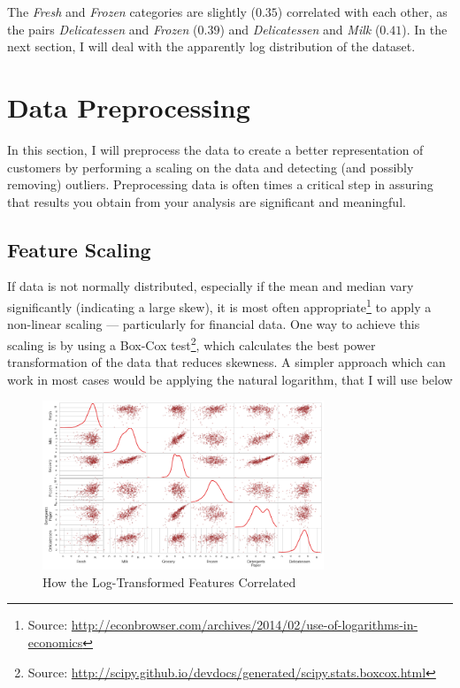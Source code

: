 \documentclass[a4paper]{article}
\begin{document}
The \textit{Fresh} and \textit{Frozen} categories are slightly ($0.35$) correlated with each other, as the pairs \textit{Delicatessen} and  \textit{Frozen} ($0.39$) and \textit{Delicatessen} and \textit{Milk} ($0.41$). In the next section, I will deal with the apparently log distribution of the dataset.


\section{Data Preprocessing}
\label{sec:data_preprocessing}
In this section, I will preprocess the data to create a better representation of customers by performing a scaling on the data and detecting (and possibly removing) outliers. Preprocessing data is often times a critical step in assuring that results you obtain from your analysis are significant and meaningful.


\subsection{Feature Scaling}
If data is not normally distributed, especially if the mean and median vary significantly (indicating a large skew), it is most often appropriate\footnote{Source: \url{http://econbrowser.com/archives/2014/02/use-of-logarithms-in-economics}} to apply a non-linear scaling — particularly for financial data. One way to achieve this scaling is by using a Box-Cox test\footnote{Source: \url{http://scipy.github.io/devdocs/generated/scipy.stats.boxcox.html}}, which calculates the best power transformation of the data that reduces skewness. A simpler approach which can work in most cases would be applying the natural logarithm, that I will use below

\begin{figure}[ht!]
\centering
\includegraphics[width=0.75\textwidth]{figures/scatter_matrix_log.png}
\caption{\label{fig:log_scatter_matrix}How the Log-Transformed Features Correlated}
\end{figure}
\end{document}
